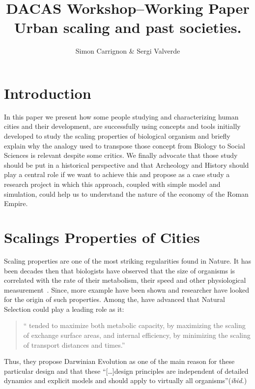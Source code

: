 \documentclass[a4paper,11pt]{article}
\title{DACAS Workshop--Working Paper\\
 Urban scaling and past societies.
}
\author{Simon Carrignon \& Sergi Valverde}
\date{}
\begin{document}
\maketitle

\section{Introduction}

In this paper we present how some people studying and characterizing human cities and their development, are successfully using concepts and tools initially developed to study the scaling properties of biological organism and briefly explain why the analogy used to transpose those concept from Biology to Social Sciences is relevant despite some critics. We finally advocate that those study should be put in a historical perspective and that Archeology and History should play a central role if we want to achieve this and propose as a case study a research project in which this approach, coupled with simple model and simulation, could help us to understand the nature of the economy of the Roman Empire.


\section{Scalings Properties of Cities}
Scaling properties are one of the most striking regularities found in Nature. It has been decades then that biologists have observed that the size of organisms is correlated with the rate of their metabolism, their speed and other physiological measurement~\citep{schmidtnielsen1984scalingwhyisanimalsizesoimportant}. Since, more example have been shown and researcher have looked for the origin of such properties. Among the, \cite{west1999thefourthdimensionoflifefractalgeometryandallometricscalingoforganisms}
have advanced that Natural Selection could play a leading role as it:
\begin{quote}
    `` tended to maximize both metabolic capacity, by maximizing the scaling of exchange surface areas, and internal efficiency, by minimizing the scaling of transport distances and times.'' 
\end{quote}

Thus, they propose Darwinian Evolution as one of the main reason for these particular design and that these ``[\ldots]design principles are independent of detailed dynamics and explicit models and should apply to  virtually all organisms''(\emph{ibid.})
\end{document}
